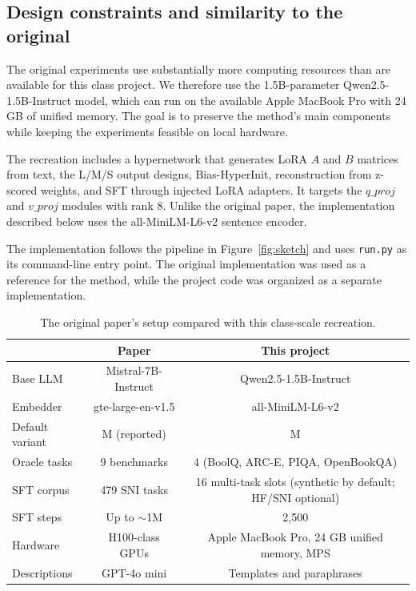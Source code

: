\documentclass{article}
\begin{document}
\subsection{Design constraints and similarity to the original}

The original experiments use substantially more computing resources than are available for this class project. We therefore use the 1.5B-parameter Qwen2.5-1.5B-Instruct model, which can run on the available Apple MacBook Pro with 24 GB of unified memory. The goal is to preserve the method's main components while keeping the experiments feasible on local hardware.

The recreation includes a hypernetwork that generates LoRA $A$ and $B$ matrices from text, the L/M/S output designs, Bias-HyperInit, reconstruction from z-scored weights, and SFT through injected LoRA adapters. It targets the $q\_proj$ and $v\_proj$ modules with rank $8$. Unlike the original paper, the implementation described below uses the all-MiniLM-L6-v2 sentence encoder.

The implementation follows the pipeline in Figure~\ref{fig:sketch} and uses \texttt{run.py} as its command-line entry point. The original implementation was used as a reference for the method, while the project code was organized as a separate implementation.

\begin{table}[t]
\centering
\caption{The original paper's setup compared with this class-scale recreation.}
\label{tab:scale}
\begin{tabular}{lcc}
\toprule
 & Paper & This project \\
\midrule
Base LLM & Mistral-7B-Instruct & Qwen2.5-1.5B-Instruct \\
Embedder & gte-large-en-v1.5 & all-MiniLM-L6-v2 \\
Default variant & M (reported) & M \\
Oracle tasks & 9 benchmarks & 4 (BoolQ, ARC-E, PIQA, OpenBookQA) \\
SFT corpus & 479 SNI tasks & 16 multi-task slots (synthetic by default; HF/SNI optional) \\
SFT steps & Up to $\sim$1M & 2,500 \\
Hardware & H100-class GPUs & Apple MacBook Pro, 24 GB unified memory, MPS \\
Descriptions & GPT-4o mini & Templates and paraphrases \\
\bottomrule
\end{tabular}
\end{table}
\end{document}
